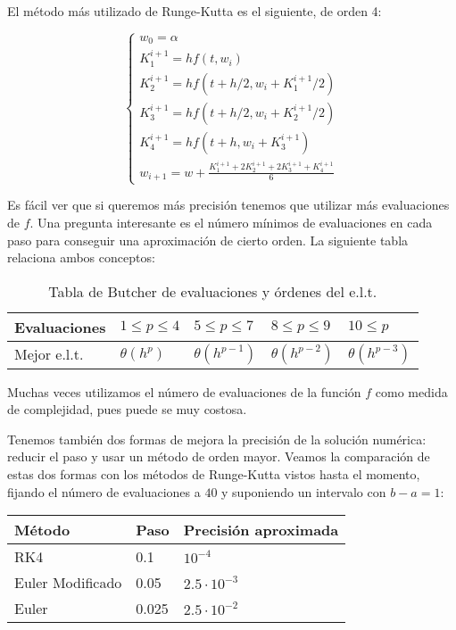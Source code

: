 El método más utilizado de Runge-Kutta es el siguiente, de orden 4:

\begin{definition}
\begin{equation}
\begin{cases}
    w_0=\alpha \\
    K_1^{i+1} = hf(t,w_i)\\
    K_2^{i+1} = hf(t + h/2,w_i+ K_1^{i+1}/2)\\
    K_3^{i+1} = hf(t + h/2,w_i+ K_2^{i+1}/2)\\
    K_4^{i+1} = hf(t + h,w_i + K_3^{i+1})\\

    w_{i+1}=w + \frac{K_1^{i+1} + 2K_2^{i+1} + 2K_3^{i+1} + K_4^{i+1}}{6}
\end{cases}
\end{equation}

\end{definition}


Es fácil ver que si queremos más precisión tenemos que utilizar más evaluaciones de $f$. Una pregunta interesante es el número mínimos de evaluaciones en cada paso para conseguir una aproximación de cierto orden. La siguiente tabla relaciona ambos conceptos:

\begin{table}[H]
\centering
\begin{tabular}{|l||l|l|l|l|}
    \hline
Evaluaciones & $1\leq p \leq 4$ & $5\leq p\leq 7$ & $8\leq p\leq 9$  & $10\leq p$ \\
    \hline
Mejor e.l.t. & $\theta(h^p)$ & $\theta(h^{p-1})$ & $\theta(h^{p-2})$ & $\theta(h^{p-3})$ \\
    \hline
\end{tabular}
\caption{Tabla de Butcher de evaluaciones y órdenes del e.l.t.}
\end{table}

Muchas veces utilizamos el número de evaluaciones de la función $f$ como medida de complejidad, pues puede se muy costosa.

Tenemos también dos formas de mejora la precisión de la solución numérica: reducir el paso y usar un método de orden mayor. Veamos la comparación de estas dos formas con los métodos de Runge-Kutta vistos hasta el momento, fijando el número de evaluaciones a $40$ y suponiendo un intervalo con $b-a=1$:

\begin{table}[H]
\centering
\begin{tabular}{|l|l|l|}
    \hline
Método           & Paso  & Precisión aproximada \\
    \hline
    \hline
RK4              & 0.1   & $10^{-4}$ \\
    \hline
Euler Modificado & 0.05  & $2.5\cdot 10^{-3}$ \\
    \hline
Euler            & 0.025 & $2.5\cdot 10^{-2}$ \\
    \hline
\end{tabular}
\end{table}

